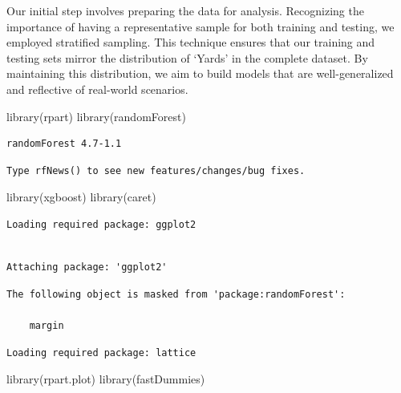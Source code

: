 \documentclass[
  super,
  preprint,
  3p]{elsarticle}
\newenvironment{Shaded}{\begin{snugshade}}{\end{snugshade}}
\newcommand{\FunctionTok}[1]{\textcolor[rgb]{0.28,0.35,0.67}{#1}}
\newcommand{\NormalTok}[1]{\textcolor[rgb]{0.00,0.23,0.31}{#1}}
\begin{document}
Our initial step involves preparing the data for analysis. Recognizing
the importance of having a representative sample for both training and
testing, we employed stratified sampling. This technique ensures that
our training and testing sets mirror the distribution of `Yards' in the
complete dataset. By maintaining this distribution, we aim to build
models that are well-generalized and reflective of real-world scenarios.

\begin{Shaded}
\begin{Highlighting}[]
\FunctionTok{library}\NormalTok{(rpart)}
\FunctionTok{library}\NormalTok{(randomForest)}
\end{Highlighting}
\end{Shaded}

\begin{verbatim}
randomForest 4.7-1.1
\end{verbatim}

\begin{verbatim}
Type rfNews() to see new features/changes/bug fixes.
\end{verbatim}

\begin{Shaded}
\begin{Highlighting}[]
\FunctionTok{library}\NormalTok{(xgboost)}
\FunctionTok{library}\NormalTok{(caret)}
\end{Highlighting}
\end{Shaded}

\begin{verbatim}
Loading required package: ggplot2
\end{verbatim}

\begin{verbatim}

Attaching package: 'ggplot2'
\end{verbatim}

\begin{verbatim}
The following object is masked from 'package:randomForest':

    margin
\end{verbatim}

\begin{verbatim}
Loading required package: lattice
\end{verbatim}

\begin{Shaded}
\begin{Highlighting}[]
\FunctionTok{library}\NormalTok{(rpart.plot)}
\FunctionTok{library}\NormalTok{(fastDummies)}
\end{Highlighting}
\end{Shaded}
\end{document}
